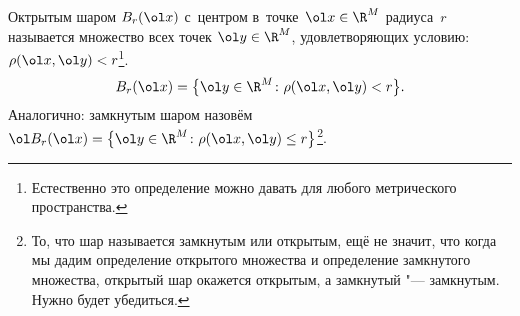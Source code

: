 
	 Октрытым шаром $B_r(\ol x)$ с~центром в~точке~$\ol x\in\R^M$ радиуса~$r$ называется множество всех точек $\ol y\in\R^M$,
	 удовлетворяющих условию: $\rho(\ol x,\ol y) < r$\footnote{Естественно это определение можно давать для любого метрического пространства.}.
	 \[ B_r(\ol x) = \big\{\ol y\in\R^M\colon \rho(\ol x,\ol y)<r\big\}.\]
	 Аналогично: замкнутым шаром назовём $\ol B_r(\ol x) = \big\{\ol y\in\R^M\colon\rho(\ol x,\ol y)\leq r\big\}$\footnote{То, что шар называется замкнутым или открытым, ещё не значит, что 
	 когда мы дадим определение открытого множества и определение замкнутого множества, открытый шар окажется открытым, а замкнутый "--- замкнутым. Нужно будет убедиться.}.
	 